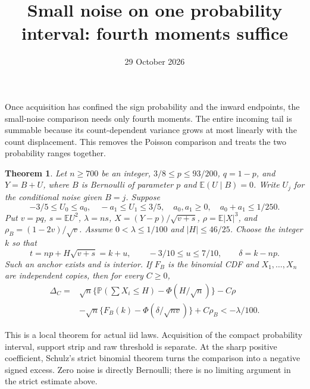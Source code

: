 \documentclass[11pt]{article}
\title{Small noise on one probability interval: fourth moments suffice}
\author{}\date{29 October 2026}
\newcommand{\E}{\mathbb E}\newcommand{\Pp}{\mathbb P}
\newtheorem{theorem}{Theorem}\newtheorem{lemma}[theorem]{Lemma}
\begin{document}
\maketitle

Once acquisition has confined the sign probability and the inward endpoints,
the small-noise comparison needs only fourth moments. The entire incoming
tail is summable because its count-dependent variance grows at most linearly
with the count displacement. This removes the Poisson comparison and treats
the two probability ranges together.

\begin{theorem}\label{th:small}
Let $n\ge700$ be an integer, $3/8\le p\le93/200$, $q=1-p$, and
$Y=B+U$, where $B$ is Bernoulli of parameter $p$ and $\E(U\mid B)=0$.
Write $U_j$ for the conditional noise given $B=j$. Suppose
\[
 -3/5\le U_0\le a_0,\quad -a_1\le U_1\le3/5,
 \quad a_0,a_1\ge0,\quad a_0+a_1\le1/250.
\]
Put $v=pq$, $s=\E U^2$, $\lambda=ns$, $X=(Y-p)/\sqrt{v+s}$,
$\rho=\E|X|^3$, and $\rho_B=(1-2v)/\sqrt v$.
Assume $0<\lambda\le1/100$ and $|H|\le46/25$. Choose the integer $k$
so that
\[
 t=np+H\sqrt{v+s}=k+u,\qquad -3/10\le u\le7/10,
 \qquad\delta=k-np.
\]
Such an anchor exists and is interior. If $F_B$ is the binomial CDF and
$X_1,\ldots,X_n$ are independent copies, then for every $C\ge0$,
\begin{align*}
\Delta_C={}&\sqrt n\{\Pp(\textstyle\sum X_i\le H)-\Phi(H/\sqrt n)\}
             -C\rho\\
 &-\sqrt n\{F_B(k)-\Phi(\delta/\sqrt{nv})\}+C\rho_B
 <-\lambda/100.
\end{align*}
\end{theorem}

This is a local theorem for actual iid laws. Acquisition of the compact
probability interval, support strip and raw threshold is separate. At the
sharp positive coefficient, Schulz's strict binomial theorem turns the
comparison into a negative signed excess. Zero noise is directly Bernoulli;
there is no limiting argument in the strict estimate above.
\end{document}
